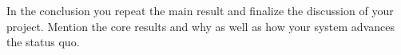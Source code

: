 \documentclass[a4paper,11pt,oneside]{report}
\begin{document}
In the conclusion you repeat the main result and finalize the discussion of
your project. Mention the core results and why as well as how your system
advances the status quo.

\cleardoublepage
{}
{}
\printbibliography

%
%
\end{document}
